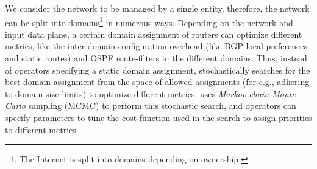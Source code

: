 We consider the network to be managed by a 
single entity, therefore, the network can 
be split into domains\footnote{
The Internet is split into domains depending 
on ownership.} in numerous ways. Depending
on the network and input data plane, a certain
domain assignment of routers 
can optimize different metrics, like the
inter-domain configuration overhead (like BGP local
preferences and static routes) and OSPF route-filters
in the different domains. Thus, instead of operators
specifying a static domain assignment, \name stochastically
searches for the best domain assignment from the space of 
allowed assignments (for e.g., adhering to domain size limits)
to optimize different metrics. \name uses 
\emph{Markov chain Monte Carlo} sampling (MCMC) to perform
this stochastic search, and operators can specify parameters
to tune the cost function used in the search to assign priorities
to different metrics. 

